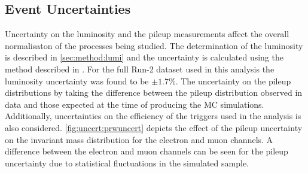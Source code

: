 \subsection{Event Uncertainties}
Uncertainty on the luminosity and the pileup measurements affect the overall normalisaton of the processes being studied. The determination of the luminosity is described in \cref{sec:method:lumi} and the uncertainty is calculated using the method described in \cite{Aaboud:2208146}. For the full Run-2 dataset used in this analysis the luminosity uncertainty was found to be $\pm 1.7\%$. The uncertainty on the pileup distributions by taking the difference between the pileup distribution observed in data and those expected at the time of producing the MC simulations. Additionally, uncertainties on the efficiency of the triggers used in the analysis is also considered.  \cref{fig:uncert:prwuncert} depicts the effect of the pileup uncertainty on the invariant mass distribution for the electron and muon channels. A difference between the electron and muon channels can be seen for the pileup uncertainty due to statistical fluctuations in the simulated sample. 
